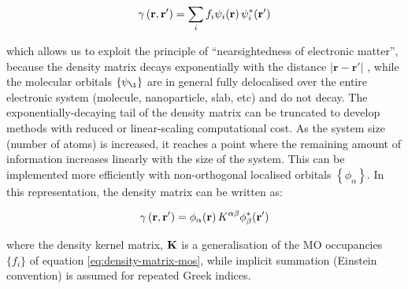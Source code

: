 \documentclass[../main.tex]{subfiles}
\begin{document}
\begin{equation}
    \gamma\left(\mathbf{r},\mathbf{r'}\right)=\sum\limits_i f_i \psi_i\!\left(\mathbf{r}\right)\psi_i^*\!\left(\mathbf{r'}\right) \label{eq:density-matrix-mos}
\end{equation}

which allows us to exploit the principle of ``nearsightedness of electronic matter'',\cite{Prodans2005} because the density matrix decays exponentially with the distance $|\mathbf{r}-\mathbf{r'}|$ \cite{Prodans2005}, while the molecular orbitals $\{ \psi_{\i} \}$ are in general fully delocalised over the entire electronic system (molecule, nanoparticle, slab, etc) and do not decay. 
The exponentially-decaying tail of the density matrix can be truncated to develop methods with reduced or linear-scaling computational cost. As the system size (number of atoms) is increased, it reaches a point where the remaining amount of information increases linearly with the size of the system. This can be implemented more efficiently with non-orthogonal localised orbitals $\left\{\phi_\alpha\right\}$.\cite{Galli1992, hernandez1995} In this representation, the density matrix can be written as:

\begin{equation}
    \gamma\left(\mathbf{r},\mathbf{r'}\right)=\phi_\alpha\!\left(\mathbf{r}\right) K^{\alpha\beta} \phi_\beta^*\!\left(\mathbf{r'}\right) 
\end{equation}

where the density kernel matrix, $\bf K$ is a generalisation of the MO occupancies $\{ f_i \} $ of equation \ref{eq:density-matrix-mos}, while implicit summation (Einstein convention) is assumed for repeated Greek indices. 
\end{document}
